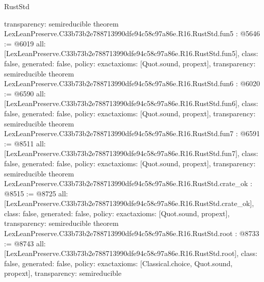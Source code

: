 \begin{lexlean}{RustStd}
\begin{coremodule}
{  transparency: semireducible
}
theorem LexLeanPreserve.C33b73b2e788713990dfe94c58c97a86e.R16.RustStd.fun5 : @5646 := @6019 {
  all: [LexLeanPreserve.C33b73b2e788713990dfe94c58c97a86e.R16.RustStd.fun5],
  class: false,
  generated: false,
  policy: exact{axioms: [Quot.sound, propext]},
  transparency: semireducible
}
theorem LexLeanPreserve.C33b73b2e788713990dfe94c58c97a86e.R16.RustStd.fun6 : @6020 := @6590 {
  all: [LexLeanPreserve.C33b73b2e788713990dfe94c58c97a86e.R16.RustStd.fun6],
  class: false,
  generated: false,
  policy: exact{axioms: [Quot.sound, propext]},
  transparency: semireducible
}
theorem LexLeanPreserve.C33b73b2e788713990dfe94c58c97a86e.R16.RustStd.fun7 : @6591 := @8511 {
  all: [LexLeanPreserve.C33b73b2e788713990dfe94c58c97a86e.R16.RustStd.fun7],
  class: false,
  generated: false,
  policy: exact{axioms: [Quot.sound, propext]},
  transparency: semireducible
}
theorem LexLeanPreserve.C33b73b2e788713990dfe94c58c97a86e.R16.RustStd.crate_ok : @8515 := @8725 {
  all: [LexLeanPreserve.C33b73b2e788713990dfe94c58c97a86e.R16.RustStd.crate_ok],
  class: false,
  generated: false,
  policy: exact{axioms: [Quot.sound, propext]},
  transparency: semireducible
}
theorem LexLeanPreserve.C33b73b2e788713990dfe94c58c97a86e.R16.RustStd.root : @8733 := @8743 {
  all: [LexLeanPreserve.C33b73b2e788713990dfe94c58c97a86e.R16.RustStd.root],
  class: false,
  generated: false,
  policy: exact{axioms: [Classical.choice, Quot.sound, propext]},
  transparency: semireducible
}


\end{coremodule}
\end{lexlean}
